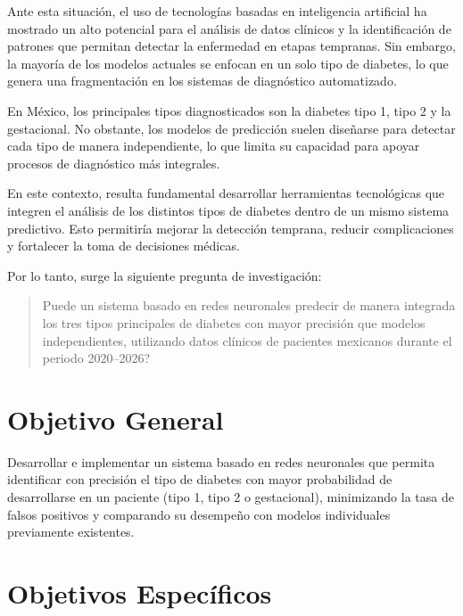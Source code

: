 Ante esta situaci\'on, el uso de tecnolog\'ias basadas en inteligencia artificial ha mostrado un alto potencial para el an\'alisis de datos cl\'inicos y la identificaci\'on de patrones que permitan detectar la enfermedad en etapas tempranas. Sin embargo, la mayor\'ia de los modelos actuales se enfocan en un solo tipo de diabetes, lo que genera una fragmentaci\'on en los sistemas de diagn\'ostico automatizado.

En M\'exico, los principales tipos diagnosticados son la diabetes tipo 1, tipo 2 y la gestacional. No obstante, los modelos de predicci\'on suelen dise\~narse para detectar cada tipo de manera independiente, lo que limita su capacidad para apoyar procesos de diagn\'ostico m\'as integrales.

En este contexto, resulta fundamental desarrollar herramientas tecnol\'ogicas que integren el an\'alisis de los distintos tipos de diabetes dentro de un mismo sistema predictivo. Esto permitir\'ia mejorar la detecci\'on temprana, reducir complicaciones y fortalecer la toma de decisiones m\'edicas.

Por lo tanto, surge la siguiente pregunta de investigaci\'on:

\begin{quote}
	\textquestiondown Puede un sistema basado en redes neuronales predecir de manera integrada los tres tipos principales de diabetes con mayor precisi\'on que modelos independientes, utilizando datos cl\'inicos de pacientes mexicanos durante el periodo 2020--2026?
\end{quote}


\section{Objetivo General}

Desarrollar e implementar un sistema basado en redes neuronales que permita identificar con precisi\'on el tipo de diabetes con mayor probabilidad de desarrollarse en un paciente (tipo 1, tipo 2 o gestacional), minimizando la tasa de falsos positivos y comparando su desempe\~no con modelos individuales previamente existentes.


\section{Objetivos Espec\'ificos}

